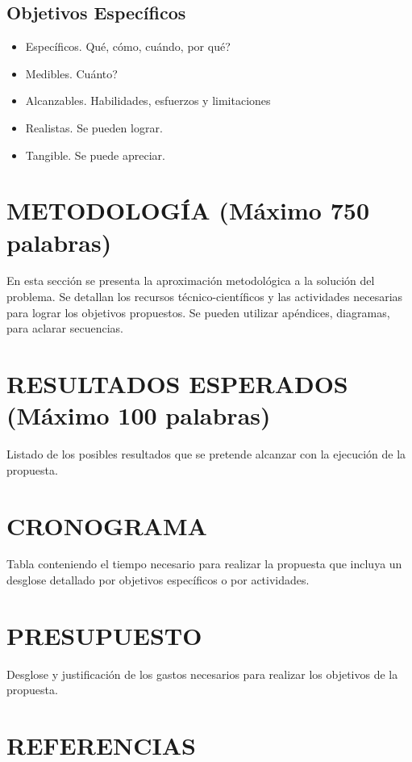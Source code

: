 \documentclass[11pt,letterpaper]{article}
\begin{document}
\subsection{Objetivos Específicos}

\begin{itemize}
\item Específicos. Qué, cómo, cuándo, por qué?
\item Medibles. Cuánto?
\item Alcanzables. Habilidades, esfuerzos y limitaciones
\item Realistas. Se pueden lograr. 
\item Tangible.  Se puede apreciar.
\end{itemize}

\section{METODOLOGÍA (Máximo 750 palabras)}

En esta sección se presenta la aproximación metodológica a la solución del problema.  Se detallan los recursos técnico-científicos y las actividades necesarias para lograr los objetivos propuestos.  Se pueden utilizar apéndices, diagramas, para aclarar secuencias.

\section{RESULTADOS ESPERADOS (Máximo 100 palabras)}

Listado de los posibles resultados que se pretende alcanzar con la 	ejecución de la propuesta.

\section{CRONOGRAMA}

Tabla conteniendo el tiempo necesario para realizar la propuesta que incluya un desglose detallado por objetivos específicos o por actividades. 

\section{PRESUPUESTO}

Desglose y justificación de los gastos necesarios para realizar los objetivos de la propuesta.

\section{REFERENCIAS}

\printbibliography[heading=none]
		
\end{document}
